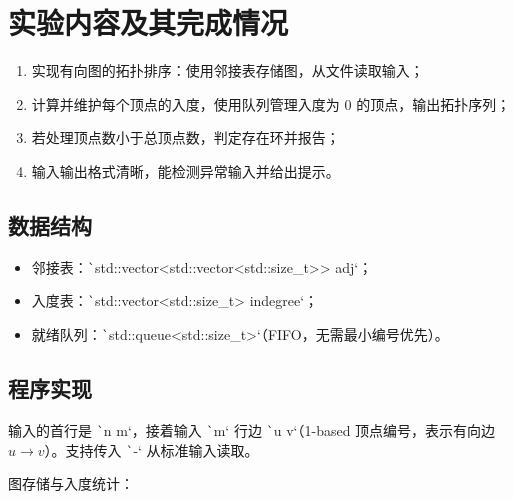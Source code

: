 \documentclass[12pt, a4paper]{ctexart}
\begin{document}
\section{实验内容及其完成情况}

\begin{enumerate}
    \item 实现有向图的拓扑排序：使用邻接表存储图，从文件读取输入；
    \item 计算并维护每个顶点的入度，使用队列管理入度为 $0$ 的顶点，输出拓扑序列；
    \item 若处理顶点数小于总顶点数，判定存在环并报告；
    \item 输入输出格式清晰，能检测异常输入并给出提示。
\end{enumerate}

\subsection{数据结构}

\begin{itemize}
    \item 邻接表：\texttt`std::vector<std::vector<std::size_t>> adj`；
    \item 入度表：\texttt`std::vector<std::size_t> indegree`；
    \item 就绪队列：\texttt`std::queue<std::size_t>`（FIFO，无需最小编号优先）。
\end{itemize}

\subsection{程序实现}

输入的首行是 \texttt`n m`，接着输入 \texttt`m` 行边 \texttt`u v`（1-based 顶点编号，表示有向边 $u\to v$）。支持传入 \texttt`-` 从标准输入读取。

图存储与入度统计：
\end{document}
